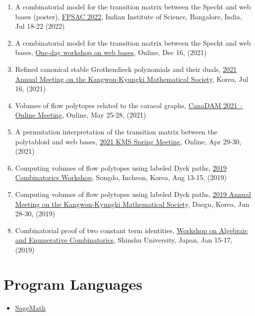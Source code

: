 \documentclass[letterpaper]{article}
\begin{document}
\begin{enumerate}
\item A combinatorial model for the transition matrix between the Specht and web bases (poster), \href{https://math.iisc.ac.in/fpsac2022/}{FPSAC 2022}, Indian Institute of Science, Bangalore, India, Jul 18-22 (2022)
\item A combinatorial model for the transition matrix between the Specht and web bases, \href{https://www.kias.re.kr/kias/activities/seminars/list.do?menuNo=404003&eventTy=&schoolsCd=C&centrspgmsCd=&pageIndex=1&sdate=2021-12-15&edate=2021-12-17&mjrcdnm=&searchCnd=1&searchWord=}{One-day workshop on web bases}, Online, Dec 16, (2021)
\item Refined canonical stable Grothendieck polynomials and their duals, \href{http://www.kkms.org/main/main}{2021 Annual Meeting on the Kangwon-Kyungki Mathematical Society}, Korea, Jul 16, (2021)
\item Volumes of flow polytopes related to the caracol graphs, \href{https://2021.canadam.math.ca/}{CanaDAM 2021 – Online Meeting}, Online, May 25-28, (2021)
\item A permutation interpretation of the transition matrix between the polytabloid and web bases, \href{https://www.kms.or.kr/meetings/spring2021/}{2021 KMS Spring Meeting}, Online, Apr 29-30, (2021)
\item Computing volumes of flow polytopes using labeled Dyck paths, \href{https://cw2019.combinatorics.kr/information}{2019 Combinatorics Workshop}, Songdo, Incheon, Korea, Aug 13-15, (2019) 
\item Computing volumes of flow polytopes using labeled Dyck paths, \href{http://www.kkms.org/main/main}{2019 Annual Meeting on the Kangwon-Kyungki Mathematical Society}, Daegu, Korea, Jun 28-30, (2019) 
\item Combinatorial proof of two constant term identities, \href{http://math.shinshu-u.ac.jp/~nu/html/workshop/20190115-shinshu/}{Workshop on Algebraic and Enumerative Combinatorics}, Shinshu University, Japan, Jan 15-17, (2019)
\end{enumerate}

\section*{Program Languages}
\begin{itemize}
\item \href{https://www.sagemath.org/}{SageMath}
\end{itemize}


\end{document}
